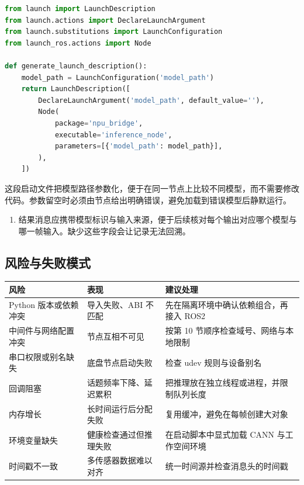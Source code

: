 \begin{lstlisting}[language=Python]
from launch import LaunchDescription
from launch.actions import DeclareLaunchArgument
from launch.substitutions import LaunchConfiguration
from launch_ros.actions import Node

def generate_launch_description():
    model_path = LaunchConfiguration('model_path')
    return LaunchDescription([
        DeclareLaunchArgument('model_path', default_value=''),
        Node(
            package='npu_bridge',
            executable='inference_node',
            parameters=[{'model_path': model_path}],
        ),
    ])
\end{lstlisting}

这段启动文件把模型路径参数化，便于在同一节点上比较不同模型，而不需要修改代码。参数留空时必须由节点给出明确错误，避免加载到错误模型后静默运行。

\begin{enumerate}
\def\labelenumi{\arabic{enumi}.}
\setcounter{enumi}{5}
\tightlist
\item
  结果消息应携带模型标识与输入来源，便于后续核对每个输出对应哪个模型与哪一帧输入。缺少这些字段会让记录无法回溯。
\end{enumerate}

\subsection{风险与失败模式}\label{ux98ceux9669ux4e0eux5931ux8d25ux6a21ux5f0f}

\begin{longtable}[]{@{}
  >{\raggedright\arraybackslash}p{}
  >{\raggedright\arraybackslash}p{}
  >{\raggedright\arraybackslash}p{}@{}}
\toprule\noalign{}
\begin{minipage}[b]{\linewidth}\raggedright
风险
\end{minipage} & \begin{minipage}[b]{\linewidth}\raggedright
表现
\end{minipage} & \begin{minipage}[b]{\linewidth}\raggedright
建议处理
\end{minipage} \\
\midrule\noalign{}
\endhead
\bottomrule\noalign{}
\endlastfoot
Python 版本或依赖冲突 & 导入失败、ABI 不匹配 &
先在隔离环境中确认依赖组合，再接入 ROS2 \\
中间件与网络配置冲突 & 节点互相不可见 & 按第 10
节顺序检查域号、网络与本地限制 \\
串口权限或别名缺失 & 底盘节点启动失败 & 检查 udev 规则与设备别名 \\
回调阻塞 & 话题频率下降、延迟累积 &
把推理放在独立线程或进程，并限制队列长度 \\
内存增长 & 长时间运行后分配失败 & 复用缓冲，避免在每帧创建大对象 \\
环境变量缺失 & 健康检查通过但推理失败 & 在启动脚本中显式加载 CANN
与工作空间环境 \\
时间戳不一致 & 多传感器数据难以对齐 & 统一时间源并检查消息头的时间戳 \\
\end{longtable}

